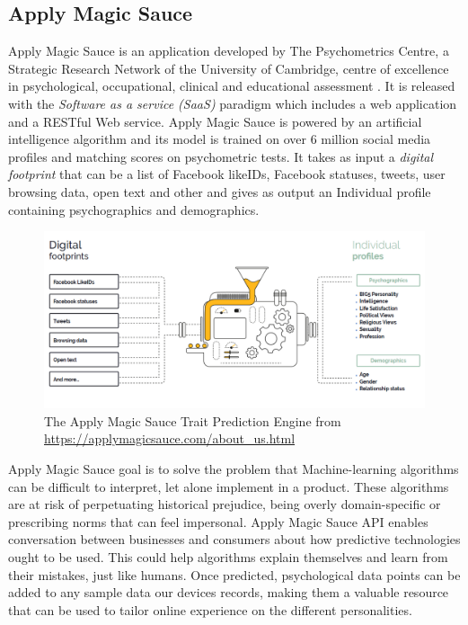 \documentclass[b5paper,10pt,twoside,cucitura]{toptesi}
\begin{document}
\subsection{Apply Magic Sauce}

Apply Magic Sauce is an application developed by The Psychometrics Centre, a Strategic Research Network of the University of Cambridge, centre of excellence in psychological, occupational, clinical and educational assessment  \citep{applymagicsauce}.  It is released with the \textit {Software as a service (SaaS)} paradigm which includes a web application and a RESTful Web service. Apply Magic Sauce is powered by an artificial intelligence algorithm and its model is trained on over 6 million social media profiles and matching scores on psychometric tests. It takes as input a \textit{digital footprint} that can be a list of Facebook likeIDs, Facebook statuses, tweets, user browsing data, open text and other and gives as output an Individual profile containing psychographics and demographics. 

\begin{figure}[ht]
\centering
\includegraphics[scale=0.455]{ams.png}
\caption{The Apply Magic Sauce Trait Prediction Engine from \url{https://applymagicsauce.com/about_us.html}}
\end{figure}

\noindent
Apply Magic Sauce goal is to solve the problem that Machine-learning algorithms can be difficult to interpret, let alone implement in a product. These algorithms are at risk of perpetuating historical prejudice, being overly domain-specific or prescribing norms that can feel impersonal. Apply Magic Sauce API enables conversation between businesses and consumers about how predictive technologies ought to be used. This could help algorithms explain themselves and learn from their mistakes, just like humans. Once predicted, psychological data points can be added to any sample data our devices records, making them a valuable resource that can be used to tailor online experience on the different personalities.
\end{document}
